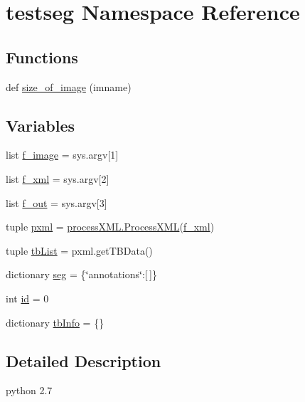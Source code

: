 \hypertarget{namespacetestseg}{}\section{testseg Namespace Reference}
\label{namespacetestseg}
\subsection*{Functions}
\begin{DoxyCompactItemize}
\item 
def \hyperlink{namespacetestseg_af1319a660f0698b8cb348a0f94881cbf}{size\+\_\+of\+\_\+image} (imname)
\end{DoxyCompactItemize}
\subsection*{Variables}
\begin{DoxyCompactItemize}
\item 
list \hyperlink{namespacetestseg_a2da58c823835c0ebab3a4e68fbdbe5d9}{f\+\_\+image} = sys.\+argv\mbox{[}1\mbox{]}
\item 
list \hyperlink{namespacetestseg_a1e995eb4b4dd78bc3460080c5aaa5bfd}{f\+\_\+xml} = sys.\+argv\mbox{[}2\mbox{]}
\item 
list \hyperlink{namespacetestseg_ab1f17c66b348dcbff515558104ebf397}{f\+\_\+out} = sys.\+argv\mbox{[}3\mbox{]}
\item 
tuple \hyperlink{namespacetestseg_aca6b8e7f85de00b3288d6fe9dfac1b0d}{pxml} = \hyperlink{classprocess_x_m_l_1_1_process_x_m_l}{process\+X\+M\+L.\+Process\+X\+M\+L}(\hyperlink{namespacetestseg_a1e995eb4b4dd78bc3460080c5aaa5bfd}{f\+\_\+xml})
\item 
tuple \hyperlink{namespacetestseg_ac9a1deec5e3475b9370d75794bc65316}{tb\+List} = pxml.\+get\+T\+B\+Data()
\item 
dictionary \hyperlink{namespacetestseg_a78990116d33c0c0ce6560fb619b73ca8}{seg} = \{\char`\"{}annotations\char`\"{}\+:\mbox{[}$\,$\mbox{]}\}
\item 
int \hyperlink{namespacetestseg_a9ea63c9f06cbe30d98fb141abbe3408f}{id} = 0
\item 
dictionary \hyperlink{namespacetestseg_ad5490470ebfd1e3f374e02c5dc028ffe}{tb\+Info} = \{\}
\end{DoxyCompactItemize}


\subsection{Detailed Description}
\begin{DoxyVerb}python 2.7 \end{DoxyVerb}
 

